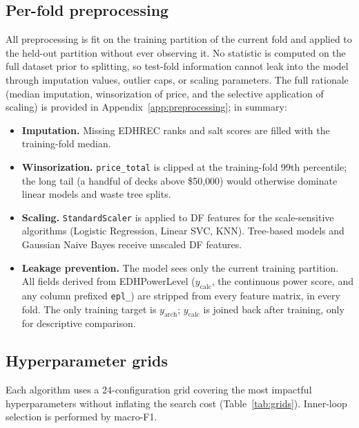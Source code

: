 \documentclass{article}
\begin{document}
\subsection{Per-fold preprocessing}
\label{sec:training:preprocessing}

All preprocessing is fit on the training partition of the current fold and applied to the held-out partition without ever observing it. No statistic is computed on the full dataset prior to splitting, so test-fold information cannot leak into the model through imputation values, outlier caps, or scaling parameters. The full rationale (median imputation, winsorization of price, and the selective application of scaling) is provided in Appendix~\ref{app:preprocessing}; in summary:

\begin{itemize}
  \item \textbf{Imputation.} Missing EDHREC ranks and salt scores are filled with the training-fold median.
  \item \textbf{Winsorization.} \texttt{price\_total} is clipped at the training-fold 99th percentile; the long tail (a handful of decks above \$50{,}000) would otherwise dominate linear models and waste tree splits.
  \item \textbf{Scaling.} \texttt{StandardScaler} is applied to DF features for the scale-sensitive algorithms (Logistic Regression, Linear SVC, KNN). Tree-based models and Gaussian Naive Bayes receive unscaled DF features.
  \item \textbf{Leakage prevention.} The model sees only the current training partition. All fields derived from EDHPowerLevel (\(y_{\text{calc}}\), the continuous power score, and any column prefixed \texttt{epl\_}) are stripped from every feature matrix, in every fold. The only training target is \(y_{\text{arch}}\); \(y_{\text{calc}}\) is joined back after training, only for descriptive comparison.
\end{itemize}

\subsection{Hyperparameter grids}
\label{sec:training:grids}

Each algorithm uses a 24-configuration grid covering the most impactful hyperparameters without inflating the search cost (Table~\ref{tab:grids}). Inner-loop selection is performed by macro-F1.
\end{document}
